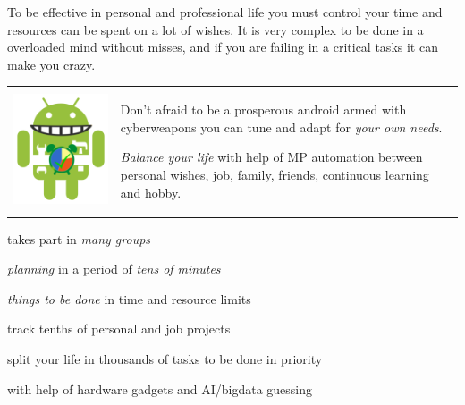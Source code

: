 
To be effective in personal and professional life you must control your time and
resources can be spent on a lot of wishes. It is very complex to be done in a
overloaded mind without misses, and if you are failing in a critical tasks it
can make you crazy.

\medskip\noindent
\begin{tabular}{p{} p{}}
\includegraphics[height=0.5\textheight,valign=t]{img/android_plan.png}
&
Don't afraid to be a prosperous android armed with cyberweapons you can tune
and adapt for \emph{your own needs}.

\medskip
\emph{Balance your life} with help of MP automation between personal wishes,
job, family, friends, continuous learning and hobby.
\\
\end{tabular}
\clearpage

\bigskip\noindent
\begin{description}[nosep]
\item[personal]  takes part in \emph{many
groups}
\item[micro] \emph{planning} in a period of \emph{tens of minutes}
\item[planning] \emph{things to be done} in time and resource limits
\item[projects] track tenths of personal and job projects
\item[tasks] split your life in thousands of tasks to be done in priority
\item[IoT] with help of hardware gadgets and AI/bigdata guessing 
\end{description}
